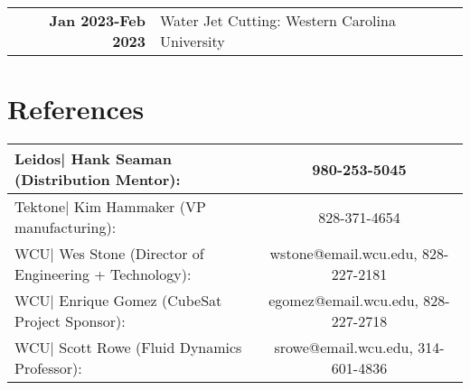 \documentclass[allblack]{simplehipstercv}
\begin{document}
\begin{paracol}{2}
\begin{tabular}{>{\footnotesize\bfseries}r p{}}
    Jan 2023-Feb 2023 & Water Jet Cutting: Western Carolina University \\
\end{tabular}

\section*{References}
\begin{tabular}{l c}
    Leidos| Hank Seaman (Distribution Mentor): & 980-253-5045\\
    \hline
    Tektone| Kim Hammaker (VP manufacturing): & 828-371-4654\\
    \hline
    WCU| Wes Stone (Director of Engineering + Technology): & wstone@email.wcu.edu, 828-227-2181\\
    \hline
    WCU| Enrique Gomez (CubeSat Project Sponsor): & egomez@email.wcu.edu, 828-227-2718\\
    \hline
    WCU| Scott Rowe (Fluid Dynamics Professor): & srowe@email.wcu.edu, 314-601-4836
\end{tabular}
\bigskip
\newpage

\end{paracol}
\end{document}
